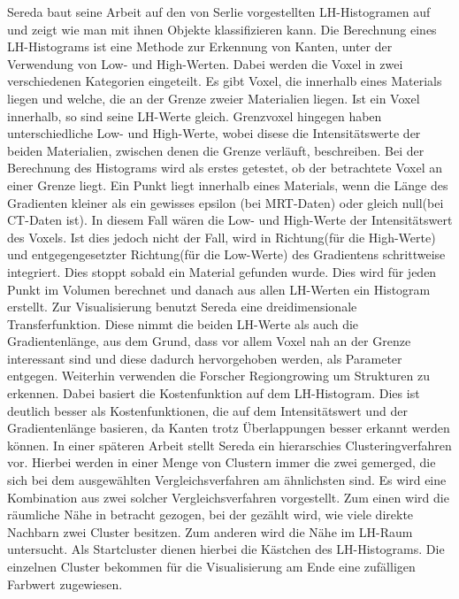 Sereda baut seine Arbeit \cite{sereda2006visualization} auf den von Serlie \cite{serlie2003computed} vorgestellten LH-Histogramen auf und zeigt wie man mit ihnen Objekte klassifizieren kann. Die Berechnung eines LH-Histograms ist eine Methode zur Erkennung von Kanten, unter der Verwendung von Low- und High-Werten. Dabei werden die Voxel in zwei verschiedenen Kategorien eingeteilt. Es gibt Voxel, die  innerhalb eines Materials liegen und welche, die  an der Grenze zweier Materialien liegen. Ist ein Voxel innerhalb, so sind seine LH-Werte gleich. Grenzvoxel hingegen haben unterschiedliche Low- und High-Werte, wobei disese die Intensitätswerte der beiden Materialien, zwischen denen die Grenze verläuft, beschreiben. 
\newline
Bei der Berechnung des Histograms wird als erstes getestet, ob der betrachtete Voxel an einer Grenze liegt. Ein Punkt liegt innerhalb eines Materials, wenn  die Länge des Gradienten kleiner als ein gewisses epsilon (bei MRT-Daten) oder gleich null(bei CT-Daten ist). In diesem Fall wären die Low- und High-Werte der Intensitätswert des Voxels. Ist dies jedoch nicht der Fall, wird in Richtung(für die High-Werte) und entgegengesetzter Richtung(für die Low-Werte) des Gradientens schrittweise integriert. Dies stoppt sobald ein Material gefunden wurde. Dies wird für jeden Punkt im Volumen berechnet und danach aus allen LH-Werten ein Histogram erstellt.
\newline 
Zur Visualisierung benutzt Sereda eine dreidimensionale Transferfunktion. Diese nimmt die beiden LH-Werte als auch die Gradientenlänge, aus dem Grund, dass vor allem Voxel nah an der Grenze interessant sind und diese dadurch hervorgehoben werden, als Parameter entgegen.
\newline
Weiterhin verwenden die Forscher Regiongrowing um Strukturen zu erkennen. Dabei basiert die Kostenfunktion auf dem LH-Histogram. Dies ist deutlich besser als Kostenfunktionen, die auf dem Intensitätswert und der Gradientenlänge basieren, da Kanten trotz Überlappungen besser erkannt werden können.
\newline
\newline
In einer späteren Arbeit \cite{sereda2006automating} stellt Sereda ein hierarschies Clusteringverfahren vor. Hierbei werden in einer Menge von Clustern immer die zwei gemerged, die sich bei dem ausgewählten Vergleichsverfahren am ähnlichsten sind. Es wird eine Kombination aus zwei solcher Vergleichsverfahren vorgestellt. Zum einen wird die räumliche Nähe in betracht gezogen, bei der gezählt wird, wie viele direkte Nachbarn zwei Cluster besitzen. Zum anderen wird die Nähe im LH-Raum untersucht. Als Startcluster dienen hierbei die Kästchen des LH-Histograms. Die einzelnen Cluster bekommen für die Visualisierung am Ende eine zufälligen Farbwert zugewiesen. 



